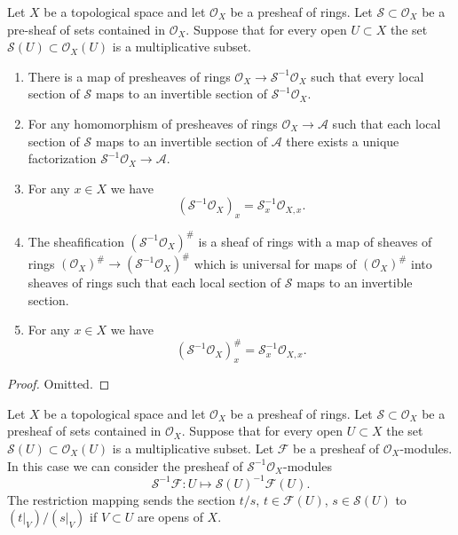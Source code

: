 \begin{lemma}
\label{lemma-simple-invert}
Let $X$ be a topological space and let $\mathcal{O}_X$ be a
presheaf of rings. Let $\mathcal{S} \subset \mathcal{O}_X$
be a pre-sheaf of sets contained in $\mathcal{O}_X$.
Suppose that for every open $U \subset X$ the set
$\mathcal{S}(U) \subset \mathcal{O}_X(U)$ is a multiplicative subset.
\begin{enumerate}
\item There is a map of presheaves of rings
$\mathcal{O}_X \to \mathcal{S}^{-1}\mathcal{O}_X$
such that every local section of $\mathcal{S}$ maps to an invertible
section of $\mathcal{S}^{-1}\mathcal{O}_X$.
\item For any homomorphism of presheaves of rings
$\mathcal{O}_X \to \mathcal{A}$ such that each local section
of $\mathcal{S}$ maps to an invertible section of $\mathcal{A}$
there exists a unique factorization
$\mathcal{S}^{-1}\mathcal{O}_X \to \mathcal{A}$.
\item For any $x \in X$ we have
$$
(\mathcal{S}^{-1}\mathcal{O}_X)_x = \mathcal{S}_x^{-1} \mathcal{O}_{X, x}.
$$
\item The sheafification $(\mathcal{S}^{-1}\mathcal{O}_X)^\#$ is a sheaf
of rings with a map of sheaves of rings
$(\mathcal{O}_X)^\# \to (\mathcal{S}^{-1}\mathcal{O}_X)^\#$
which is universal for maps of $(\mathcal{O}_X)^\#$ into sheaves
of rings such that each local section of $\mathcal{S}$ maps
to an invertible section.
\item For any $x \in X$ we have
$$
(\mathcal{S}^{-1}\mathcal{O}_X)^\#_x = \mathcal{S}_x^{-1} \mathcal{O}_{X, x}.
$$
\end{enumerate}
\end{lemma}

\begin{proof}
Omitted.
\end{proof}

\noindent
Let $X$ be a topological space and let $\mathcal{O}_X$ be a
presheaf of rings. Let $\mathcal{S} \subset \mathcal{O}_X$
be a presheaf of sets contained in $\mathcal{O}_X$.
Suppose that for every open $U \subset X$ the set
$\mathcal{S}(U) \subset \mathcal{O}_X(U)$ is a multiplicative subset.
Let $\mathcal{F}$ be a presheaf of $\mathcal{O}_X$-modules.
In this case we can consider the presheaf of
$\mathcal{S}^{-1}\mathcal{O}_X$-modules
$$
\mathcal{S}^{-1}\mathcal{F} :
U \longmapsto \mathcal{S}(U)^{-1}\mathcal{F}(U).
$$
The restriction mapping sends the section $t/s$, $t \in \mathcal{F}(U)$,
$s \in \mathcal{S}(U)$ to $(t|_V)/(s|_V)$ if $V \subset U$ are opens
of $X$.


